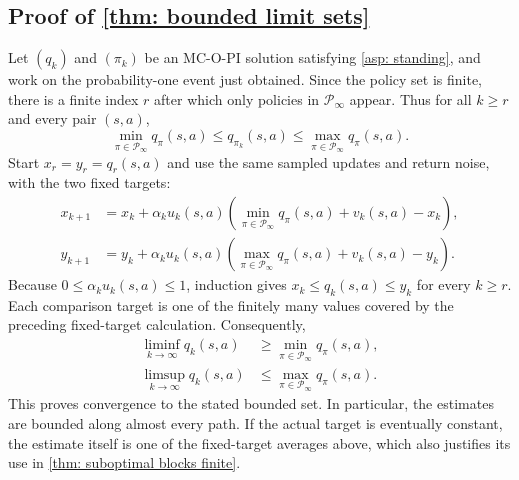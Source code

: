 \documentclass[twoside,11pt]{article}
\newcommand{\polset}{\mathcal{P}}
\DeclareRobustCommand{\reviewbarstart}{%
  \ifhmode %
    \vadjust{\vbox to 0pt{%
      \vskip-\ht\strutbox %
      \vskip-\dp\strutbox %
      \cbstart[\changebarwidth] %
      \vss %
    }}%
  \else %
    \cbstart[\changebarwidth]%
  \fi %
} %
\providecommand{\DIFadd}[1]{#1} %
\providecommand{\DIFaddbegin}{\reviewbarstart} %
\providecommand{\DIFaddend}{\protect\cbend} %
\def\DIFadd#1{#1}%
\def\DIFaddbegin{}%
\def\DIFaddend{}%
\begin{document}
 \DIFaddbegin \subsection{\DIFadd{Proof of \autoref{thm: bounded limit sets}}}
\label{app: bounded estimates}
\DIFadd{Let $(q_k)$ and $(\pi_k)$ be an MC-O-PI solution satisfying \autoref{asp: standing}, and work on the probability-one event just obtained. Since the policy set is finite, there is a finite index $r$ after which only }\DIFaddend policies in $\polset_\infty$  \DIFaddbegin \DIFadd{appear.
}\DIFaddend Thus for all  \DIFaddbegin \DIFadd{$k\ge r$ and every pair $(s,a)$,
}\[
\DIFadd{\min_{\pi\in\polset_\infty}q_\pi(s,a)
\le q_{\pi_k}(s,a)
\le\max_{\pi\in\polset_\infty}q_\pi(s,a).
}\]\DIFaddend 
 \DIFaddbegin \DIFadd{Start $x_r=y_r=q_r(s,a)$ and use the same sampled updates and return noise, with the two fixed targets:
}\begin{align*}
\DIFadd{x_{k+1}}&\DIFadd{=x_k+\alpha_k u_k(s,a)
\left(\min_{\pi\in\polset_\infty}q_\pi(s,a)+v_k(s,a)-x_k\right),}\\
\DIFadd{y_{k+1}}&\DIFadd{=y_k+\alpha_k u_k(s,a)
\left(\max_{\pi\in\polset_\infty}q_\pi(s,a)+v_k(s,a)-y_k\right).
}\end{align*}\DIFaddend 
 \DIFaddbegin \DIFadd{Because $0\le\alpha_k u_k(s,a)\le1$, induction gives $x_k\le q_k(s,a)\le y_k$ }\DIFaddend for every  \DIFaddbegin \DIFadd{$k\ge r$.
Each comparison target is one of the finitely many values covered by the preceding fixed-target calculation. Consequently,
}\begin{align*}
\DIFadd{\liminf_{k\to\infty}q_k(s,a)}&\DIFadd{\ge\min_{\pi\in\polset_\infty}q_\pi(s,a),}\\
\DIFadd{\limsup_{k\to\infty}q_k(s,a)}&\DIFadd{\le\max_{\pi\in\polset_\infty}q_\pi(s,a).
}\end{align*}
\DIFadd{This proves convergence to the stated bounded set. In particular, the estimates are bounded along almost every path. If the actual target is eventually constant, the estimate itself is one of the fixed-target averages above, which also justifies its use in \autoref{thm: suboptimal blocks finite}.
}\hfill\BlackBox
\DIFaddend 
\end{document}
